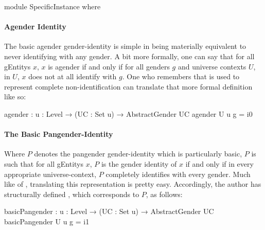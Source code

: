 \documentclass{article}
\theoremstyle{remark}
\begin{document}
\begin{code}
  module SpecificInstance where
\end{code}

\paragraph{Agender Identity}\label{sec:gender8exampleIdentityAgender}
The basic agender gender-identity is simple in being materially equivalent to never identifying with any gender.  A bit more formally, one can say that for all \glspl{gEntity} \(x\), \(x\) is agender if and only if for all genders \(g\) and universe contexts \(U\), in \(U\), \(x\) does not at all identify with \(g\).  One who remembers that  is used to represent complete non-identification can translate that more formal definition like so:

\begin{code}
    agender : {u : Level} → (UC : Set u) → AbstractGender UC
    agender U u g = i0
\end{code}

\paragraph{The Basic Pangender-Identity}\label{sec:gender8exampleIdentityPangenderBasic}
Where \(P\) denotes the pangender gender-identity which is particularly basic, \(P\) is such that for all \glspl{gEntity} \(x\), \(P\) is the gender identity of \(x\) if and only if in every appropriate universe-context, \(P\) completely identifies with every gender.  Much like  of , translating this representation is pretty easy.  Accordingly, the author has structurally defined , which corresponds to \(P\), as follows:

\begin{code}
    basicPangender : {u : Level} → (UC : Set u) → AbstractGender UC
    basicPangender U u g = i1
\end{code}
\end{document}
